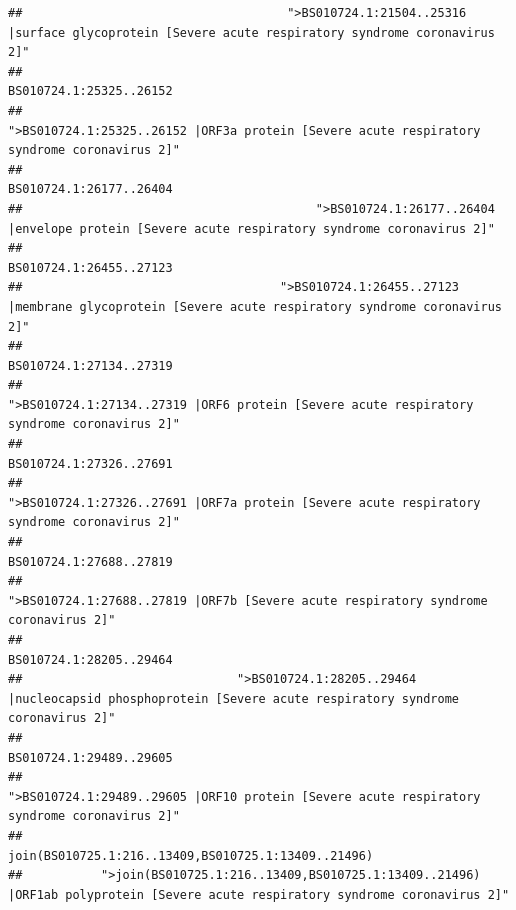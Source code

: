 \documentclass[
]{article}
\begin{document}
\begin{verbatim}
##                                     ">BS010724.1:21504..25316 |surface glycoprotein [Severe acute respiratory syndrome coronavirus 2]" 
##                                                                                                                BS010724.1:25325..26152 
##                                            ">BS010724.1:25325..26152 |ORF3a protein [Severe acute respiratory syndrome coronavirus 2]" 
##                                                                                                                BS010724.1:26177..26404 
##                                         ">BS010724.1:26177..26404 |envelope protein [Severe acute respiratory syndrome coronavirus 2]" 
##                                                                                                                BS010724.1:26455..27123 
##                                    ">BS010724.1:26455..27123 |membrane glycoprotein [Severe acute respiratory syndrome coronavirus 2]" 
##                                                                                                                BS010724.1:27134..27319 
##                                             ">BS010724.1:27134..27319 |ORF6 protein [Severe acute respiratory syndrome coronavirus 2]" 
##                                                                                                                BS010724.1:27326..27691 
##                                            ">BS010724.1:27326..27691 |ORF7a protein [Severe acute respiratory syndrome coronavirus 2]" 
##                                                                                                                BS010724.1:27688..27819 
##                                                    ">BS010724.1:27688..27819 |ORF7b [Severe acute respiratory syndrome coronavirus 2]" 
##                                                                                                                BS010724.1:28205..29464 
##                              ">BS010724.1:28205..29464 |nucleocapsid phosphoprotein [Severe acute respiratory syndrome coronavirus 2]" 
##                                                                                                                BS010724.1:29489..29605 
##                                            ">BS010724.1:29489..29605 |ORF10 protein [Severe acute respiratory syndrome coronavirus 2]" 
##                                                                                    join(BS010725.1:216..13409,BS010725.1:13409..21496) 
##           ">join(BS010725.1:216..13409,BS010725.1:13409..21496) |ORF1ab polyprotein [Severe acute respiratory syndrome coronavirus 2]" 

\end{verbatim}
\end{document}
